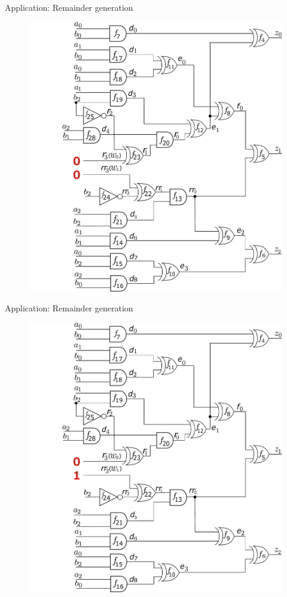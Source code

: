 \begin{frame}{\large Application: Remainder generation}
\begin{figure}[hbt]
\centering
    \includegraphics[scale = 0.28]{mas_3_ddc_mfr_b_00.pdf}
    \caption*{}
\end{figure}
\end{frame}

\begin{frame}{\large Application: Remainder generation}
\begin{figure}[hbt]
\centering
    \includegraphics[scale = 0.28]{mas_3_ddc_mfr_b_10.pdf}
    \caption*{}
\end{figure}
\end{frame}

